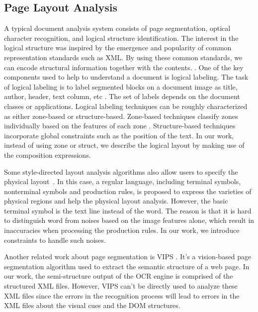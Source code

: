\subsection{Page Layout Analysis}
A typical document analysis system consists of page segmentation, 
optical character recognition, and logical structure identification. 
The interest in the logical structure was inspired by the 
emergence and popularity of common representation standards such as XML. 
By using these common standards, we can encode structural information 
together with the contents. \cite{o1993document}. 
One of the key components used to help to understand a document is logical 
labeling. 
The task of logical labeling is to label segmented blocks on a document 
image as title, author, header, text column, etc \cite{liang2002logical}. 
The set of labels depends on the document classes or applications. 
Logical labeling techniques can be roughly characterized as either 
zone-based or structure-based. Zone-based 
techniques classify zones individually based on the features of each zone 
\cite{altamura2001transforming,palmero1999structured}. 
Structure-based techniques incorporate global constraints such 
as the position of the text. 
In our work, instead of using zone or struct, 
we describe the logical layout by making 
use of the composition expressions. 

Some style-directed layout analysis algorithms 
also allow users to specify the physical layout~\cite{kanungo2003stochastic}.
In this case, a regular language, including terminal symbols, 
nonterminal symbols and production rules, is proposed to express 
the varieties of physical regions and help the physical layout analysis.
However, the basic terminal symbol is the text line instead of the word. 
The reason is that it is hard to distinguish word from noises based on the 
image features alone, which result in inaccuracies when processing 
the production rules. In our work, we introduce constraints to 
handle such noises.  

Another related work about page segmentation is VIPS \cite{cai2003vips}. 
It's a vision-based page segmentation algorithm used to extract the semantic 
structure of a web page. 
In our work, the semi-structure output of the OCR engine is comprised of the 
structured XML files. However, VIPS can't be directly used to analyze 
these XML files since the errors in the recognition process will 
lead to errors in the XML files about the visual cues 
and the DOM structures. 

